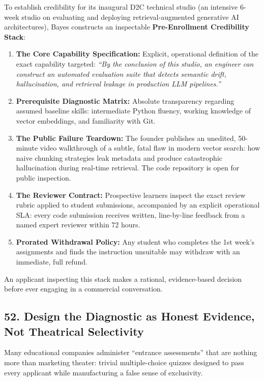 To establish credibility for its inaugural D2C technical studio (an intensive 6-week studio on evaluating and deploying retrieval-augmented generative AI architectures), Bayes constructs an inspectable \textbf{Pre-Enrollment Credibility Stack}:
\begin{enumerate}
\item \textbf{The Core Capability Specification:} Explicit, operational definition of the exact capability targeted: \emph{``By the conclusion of this studio, an engineer can construct an automated evaluation suite that detects semantic drift, hallucination, and retrieval leakage in production LLM pipelines.''}
\item \textbf{Prerequisite Diagnostic Matrix:} Absolute transparency regarding assumed baseline skills: intermediate Python fluency, working knowledge of vector embeddings, and familiarity with Git.
\item \textbf{The Public Failure Teardown:} The founder publishes an unedited, 50-minute video walkthrough of a subtle, fatal flaw in modern vector search: how naive chunking strategies leak metadata and produce catastrophic hallucination during real-time retrieval. The code repository is open for public inspection.
\item \textbf{The Reviewer Contract:} Prospective learners inspect the exact review rubric applied to student submissions, accompanied by an explicit operational SLA: every code submission receives written, line-by-line feedback from a named expert reviewer within 72 hours.
\item \textbf{Prorated Withdrawal Policy:} Any student who completes the 1st week's assignments and finds the instruction unsuitable may withdraw with an immediate, full refund.
\end{enumerate}

An applicant inspecting this stack makes a rational, evidence-based decision before ever engaging in a commercial conversation.

\subsection*{52. Design the Diagnostic as Honest Evidence, Not Theatrical Selectivity}

Many educational companies administer ``entrance assessments'' that are nothing more than marketing theater: trivial multiple-choice quizzes designed to pass every applicant while manufacturing a false sense of exclusivity.


